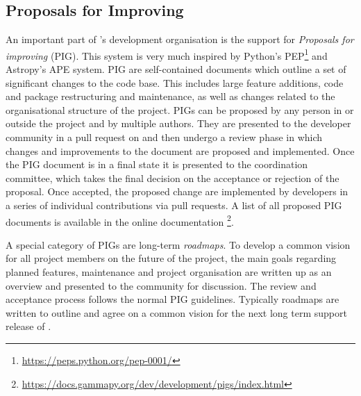 \documentclass[longauth]{aa}
\begin{document}
\subsection{Proposals for Improving \gammapy}
\label{ssec:pigs}
An important part of \gammapy's development organisation is the support
for \textit{Proposals for improving \gammapy} (PIG). This system is very much
inspired by Python's PEP\footnote{\url{https://peps.python.org/pep-0001/}}
and Astropy's APE \citep{greenfield_perry_2013} system.
PIG are self-contained documents which outline a set of significant
changes to the \gammapy code base. This includes large feature additions,
code and package restructuring and maintenance, as well as changes related
to the organisational structure of the \gammapy project. PIGs can be proposed
by any person in or outside the project and by multiple authors. They
are presented to the \gammapy developer community in a pull request
on \github and then undergo a review phase in which changes and
improvements to the document are proposed and implemented. Once the PIG
document is in a final state it is presented to the \gammapy
coordination committee, which takes the final decision on the
acceptance or rejection of the proposal. Once accepted, the proposed
change are implemented by \gammapy developers in a series of
individual contributions via pull requests. A list of all proposed
PIG documents is available in the \gammapy online documentation
\footnote{\url{https://docs.gammapy.org/dev/development/pigs/index.html}}.

A special category of PIGs are long-term \textit{roadmaps}. To develop a common
vision for all \gammapy project members on the future of the
project, the main goals regarding planned features, maintenance and
project organisation are written up as an overview and presented to the
\gammapy community for discussion. The review and acceptance process
follows the normal PIG guidelines. Typically roadmaps are written
to outline and agree on a common vision for the next long term
support release of \gammapy.
\end{document}
